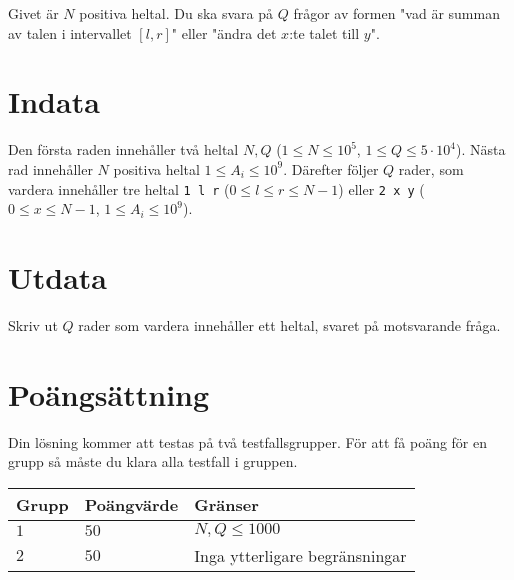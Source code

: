 Givet är $N$ positiva heltal. Du ska svara på $Q$ frågor av formen "vad är summan av talen i intervallet $[l,r]$" eller "ändra det $x$:te talet till $y$".

\section*{Indata}
Den första raden innehåller två heltal $N, Q$ ($1 \leq N \leq 10^5$, $1 \leq Q \leq 5 \cdot 10^4$).
Nästa rad innehåller $N$ positiva heltal $1 \leq A_i \leq 10^9$.
Därefter följer $Q$ rader, som vardera innehåller tre heltal \texttt{1 l r} ($0 \leq l \leq r \leq N-1$) eller \texttt{2 x y} ($0 \leq x \leq N-1$, $1 \leq A_i \leq 10^9$).

\section*{Utdata}
Skriv ut $Q$ rader som vardera innehåller ett heltal, svaret på motsvarande fråga.

\section*{Poängsättning}
Din lösning kommer att testas på två testfallsgrupper.
\noindent
För att få poäng för en grupp så måste du klara alla testfall i gruppen.

\noindent
\begin{tabular}{| l | l | l |}
\hline
  Grupp & Poängvärde & Gränser \\ \hline
  $1$    & $50$       &  $N,Q \leq 1000$ \\ \hline
  $2$    & $50$       &  Inga ytterligare begränsningar \\ \hline
\end{tabular}
